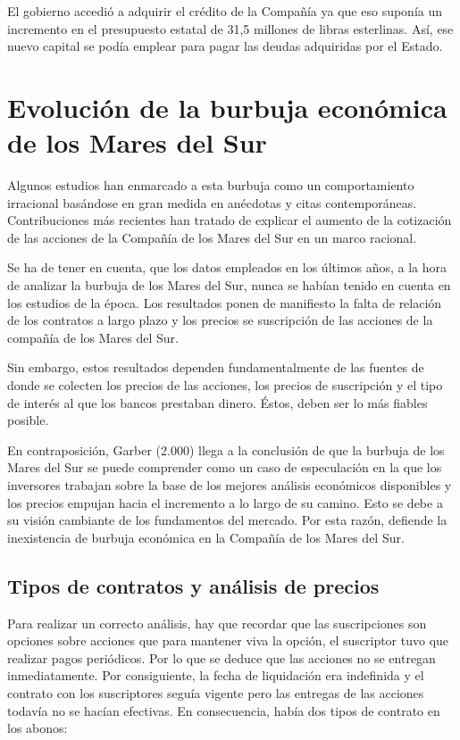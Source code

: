 El gobierno accedió a adquirir el crédito de la Compañía ya que eso suponía un incremento en el presupuesto estatal de 31,5 millones de libras esterlinas. Así, ese nuevo capital se podía emplear para pagar las deudas adquiridas por el Estado. 

\section{Evolución de la burbuja económica de los Mares del Sur}

Algunos estudios han enmarcado a esta burbuja como un comportamiento irracional basándose en gran medida en anécdotas y citas contemporáneas. Contribuciones más recientes han tratado de explicar el aumento de la cotización de las acciones de la Compañía de los Mares del Sur en un marco racional.

Se ha de tener en cuenta, que los datos empleados en los últimos años, a la hora de analizar la burbuja de los Mares del Sur, nunca se habían tenido en cuenta en los estudios de la época. Los resultados ponen de manifiesto la falta de relación de los contratos a largo plazo y los precios se suscripción de las acciones de la compañía de los Mares del Sur.

Sin embargo, estos resultados dependen fundamentalmente de las fuentes de donde se colecten los precios de las acciones, los precios de suscripción y el tipo de interés al que los bancos prestaban dinero. Éstos, deben ser lo más fiables posible.

En contraposición, Garber (2.000) llega a la conclusión de que la burbuja de los Mares del Sur se puede comprender como un caso de especulación en la que los inversores trabajan sobre la base de los mejores análisis económicos disponibles y los precios empujan hacia el incremento a lo largo de su camino. Esto se debe a su visión cambiante de los fundamentos del mercado. Por esta razón, defiende la inexistencia de burbuja económica en la Compañía de los Mares del Sur.

\subsection{Tipos de contratos y análisis de precios}

Para realizar un correcto análisis, hay que recordar que las suscripciones son opciones sobre acciones que para mantener viva la opción, el suscriptor tuvo que realizar pagos periódicos. Por lo que se deduce que las acciones no se entregan inmediatamente. Por consiguiente, la fecha de liquidación era indefinida y el contrato con los suscriptores seguía vigente pero las entregas de las acciones todavía no se hacían efectivas. En consecuencia, había dos tipos de contrato en los abonos: 

